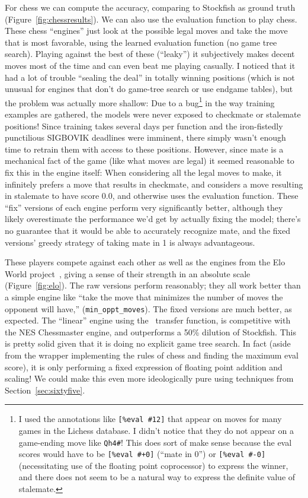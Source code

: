 \documentclass[twocolumn]{article}
\begin{document}
For chess we can compute the accuracy, comparing to Stockfish as
ground truth (Figure~\ref{fig:chessresults}). We can also use the
evaluation function to play chess. These chess ``engines'' just look
at the possible legal moves and take the move that is most favorable,
using the learned evaluation function (no game tree search). Playing
against the best of these (``leaky'') it subjectively makes decent
moves most of the time and can even beat me playing casually. I
noticed that it had a lot of trouble ``sealing the deal'' in totally
winning positions (which is not unusual for engines that don't do
game-tree search or use endgame tables), but the problem was actually
more shallow: Due to a bug\footnote{ I used the annotations like
  \verb|[%eval #12]| that appear on moves for many games in the
  Lichess database. I didn't notice that they do not appear on a
  game-ending move like \verb+Qh4#+! This does sort of make sense
  because the eval scores would have to be \verb|[%eval #+0]| (``mate
  in 0'') or \verb|[%eval #-0]| (necessitating use of the floating
  point coprocessor) to express the winner, and there does not seem to
  be a natural way to express the definite value of stalemate. } in the
way training examples are gathered, the models were never exposed to
checkmate or stalemate positions! Since training takes several days
per function and the iron-fistedly punctilious SIGBOVIK deadlines were
imminent, there simply wasn't enough time to retrain them with access
to these positions. However, since mate is a mechanical fact of the
game (like what moves are legal) it seemed reasonable to fix this in
the engine itself: When considering all the legal moves to make, it
infinitely prefers a move that results in checkmate, and considers a
move resulting in stalemate to have score 0.0, and otherwise uses the
evaluation function. These ``fix'' versions of each engine perform
very significantly better, although they likely overestimate the
performance we'd get by actually fixing the model; there's no
guarantee that it would be able to accurately recognize mate, and the
fixed versions' greedy strategy of taking mate in 1 is always
advantageous.

These players compete against each other as well as the engines from
the Elo World project~\cite{murphy2019eloworld}, giving a sense of
their strength in an absolute scale (Figure~\ref{fig:elo}). The raw
versions perform reasonably; they all work better than a simple engine
like ``take the move that minimizes the number of moves the opponent
will have,'' (\verb+min_oppt_moves+). The fixed versions are much
better, as expected. The ``linear'' engine using the
\gradone\ transfer function, is competitive with the NES Chessmaster
engine, and outperforms a 50\% dilution of Stockfish. This is pretty
solid given that it is doing no explicit game tree search. In fact
(aside from the wrapper implementing the rules of chess and finding
the maximum eval score), it is only performing a fixed expression of
floating point addition and scaling! We could make this even more
ideologically pure using techniques from Section~\ref{sec:sixtyfive}.
\end{document}
